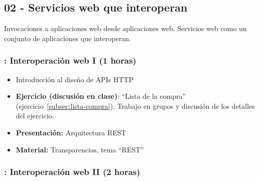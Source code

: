 \documentclass[a4paper,12pt]{article}
\begin{document}
\subsection{02 - Servicios web que interoperan}

Invocaciones a aplicaciones web desde aplicaciones web. Servicios web como un conjunto de aplicaciones que interoperan.

\subsubsection{\juevesF: Interoperación web I (1 horas)}

\begin{itemize}
\item Introducción al diseño de APIs HTTP
\item \textbf{Ejercicio (discusión en clase)}: ``Lista de la compra'' (ejercicio~\ref{subsec:lista-compra}).
  Trabajo en grupos y discusión de los detalles del ejercicio.
\item \textbf{Presentación:} Arquitectura REST
\item \textbf{Material:} Transparencias, tema ``REST''
\end{itemize}

\subsubsection{\juevesG: Interoperación web II (2 horas)}
\label{cal:juevesG}
\end{document}
